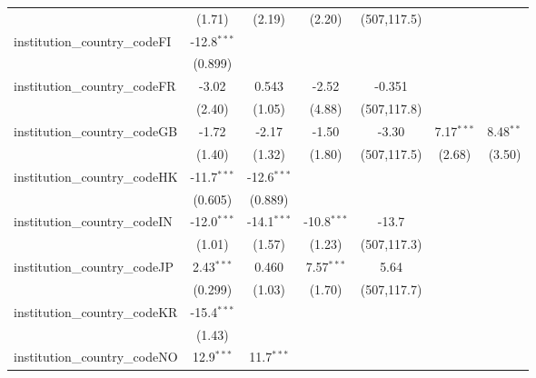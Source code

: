 \begin{tabular}{lcccccc}
                                         & (1.71)        & (2.19)        & (2.20)        & (507,117.5)  &               &   \\   
   institution\_country\_codeFI          & -12.8$^{***}$ &               &               &              &               &   \\   
                                         & (0.899)       &               &               &              &               &   \\   
   institution\_country\_codeFR          & -3.02         & 0.543         & -2.52         & -0.351       &               &   \\   
                                         & (2.40)        & (1.05)        & (4.88)        & (507,117.8)  &               &   \\   
   institution\_country\_codeGB          & -1.72         & -2.17         & -1.50         & -3.30        & 7.17$^{***}$  & 8.48$^{**}$\\   
                                         & (1.40)        & (1.32)        & (1.80)        & (507,117.5)  & (2.68)        & (3.50)\\   
   institution\_country\_codeHK          & -11.7$^{***}$ & -12.6$^{***}$ &               &              &               &   \\   
                                         & (0.605)       & (0.889)       &               &              &               &   \\   
   institution\_country\_codeIN          & -12.0$^{***}$ & -14.1$^{***}$ & -10.8$^{***}$ & -13.7        &               &   \\   
                                         & (1.01)        & (1.57)        & (1.23)        & (507,117.3)  &               &   \\   
   institution\_country\_codeJP          & 2.43$^{***}$  & 0.460         & 7.57$^{***}$  & 5.64         &               &   \\   
                                         & (0.299)       & (1.03)        & (1.70)        & (507,117.7)  &               &   \\   
   institution\_country\_codeKR          & -15.4$^{***}$ &               &               &              &               &   \\   
                                         & (1.43)        &               &               &              &               &   \\   
   institution\_country\_codeNO          & 12.9$^{***}$  & 11.7$^{***}$  &               &              &               &   \\   

\end{tabular}
